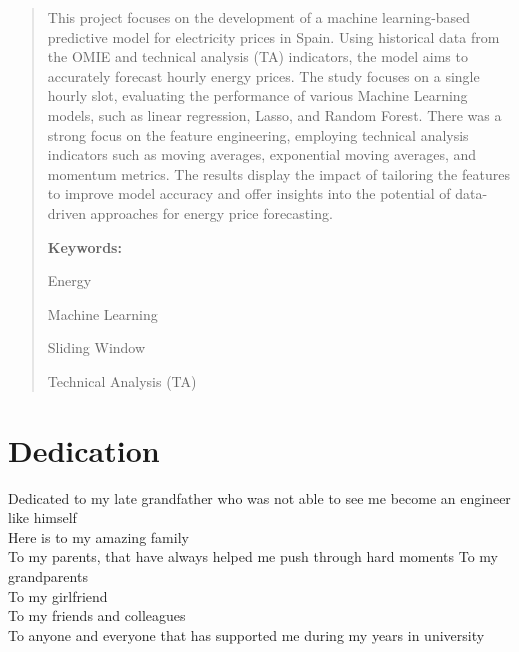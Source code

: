 \documentclass[12pt]{report} %
\begin{document}
\renewcommand\abstractname{\large\bfseries\filcenter\uppercase{Summary}}
\begin{abstract}
\thispagestyle{plain}
\setcounter{page}{3}
	
    This project focuses on the development of a machine learning-based predictive model for electricity prices in Spain. Using historical data from the OMIE and technical analysis (TA) indicators, the model aims to accurately forecast hourly energy prices. The study focuses on a single hourly slot, evaluating the performance of various Machine Learning models, such as linear regression, Lasso, and Random Forest. There was a strong focus on the feature engineering, employing technical analysis indicators such as moving averages, exponential moving averages, and momentum metrics. The results display the impact of tailoring the features to improve model accuracy and offer insights into the potential of data-driven approaches for energy price forecasting.

\bigskip
	\textbf{Keywords:} %
            
            Energy
            
            Machine Learning
            
            Sliding Window

            Technical Analysis (TA)

            
	
	\vfill
\end{abstract}
\newpage %
\thispagestyle{empty}
\mbox{}


\chapter*{Dedication}

\setcounter{page}{5}

\noindent Dedicated to my late grandfather who was not able to see me become an engineer like himself\\
Here is to my amazing family\\
To my parents, that have always helped me push through hard moments
To my grandparents\\
To my girlfriend\\
To my friends and colleagues\\
To anyone and everyone that has supported me during my years in university\\
\end{document}
